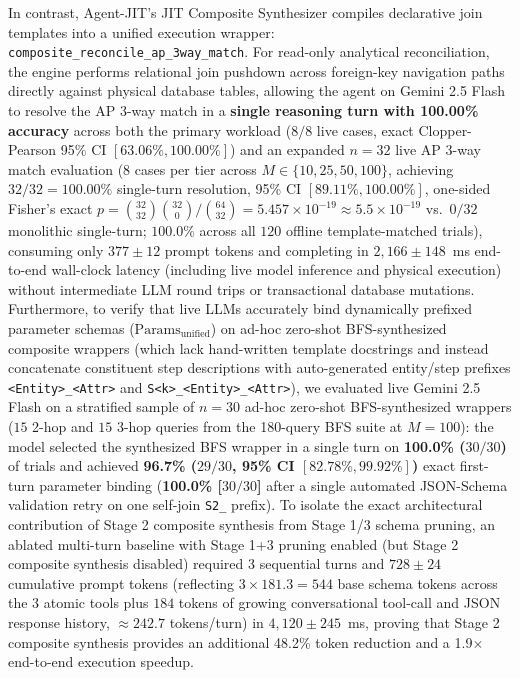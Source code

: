 \documentclass[conference,10pt]{IEEEtran}
\begin{document}
In contrast, Agent-JIT's JIT Composite Synthesizer compiles declarative join templates into a unified execution wrapper: \texttt{composite\_reconcile\_ap\_3way\_match}. For read-only analytical reconciliation, the engine performs relational join pushdown across foreign-key navigation paths directly against physical database tables, allowing the agent on Gemini 2.5 Flash to resolve the AP 3-way match in a \textbf{single reasoning turn with 100.00\% accuracy} across both the primary workload ($8/8$ live cases, exact Clopper-Pearson 95\% CI $[63.06\%, 100.00\%]$) and an expanded $n = 32$ live AP 3-way match evaluation ($8$ cases per tier across $M \in \{10, 25, 50, 100\}$, achieving $32/32 = 100.00\%$ single-turn resolution, 95\% CI $[89.11\%, 100.00\%]$, one-sided Fisher's exact $p = \binom{32}{32}\binom{32}{0}/\binom{64}{32} = 5.457 \times 10^{-19} \approx 5.5 \times 10^{-19}$ vs.\ $0/32$ monolithic single-turn; $100.0\%$ across all $120$ offline template-matched trials), consuming only $377 \pm 12$ prompt tokens and completing in $2{,}166 \pm 148$~ms end-to-end wall-clock latency (including live model inference and physical execution) without intermediate LLM round trips or transactional database mutations. Furthermore, to verify that live LLMs accurately bind dynamically prefixed parameter schemas ($\text{Params}_{\text{unified}}$) on ad-hoc zero-shot BFS-synthesized composite wrappers (which lack hand-written template docstrings and instead concatenate constituent step descriptions with auto-generated entity/step prefixes \texttt{<Entity>\_<Attr>} and \texttt{S<k>\_<Entity>\_<Attr>}), we evaluated live Gemini 2.5 Flash on a stratified sample of $n = 30$ ad-hoc zero-shot BFS-synthesized wrappers ($15$ 2-hop and $15$ 3-hop queries from the 180-query BFS suite at $M = 100$): the model selected the synthesized BFS wrapper in a single turn on \textbf{100.0\% ($30/30$)} of trials and achieved \textbf{96.7\% ($29/30$, 95\% CI $[82.78\%, 99.92\%]$)} exact first-turn parameter binding (\textbf{100.0\% [$30/30$]} after a single automated JSON-Schema validation retry on one self-join \texttt{S2\_} prefix). To isolate the exact architectural contribution of Stage 2 composite synthesis from Stage 1/3 schema pruning, an ablated multi-turn baseline with Stage 1+3 pruning enabled (but Stage 2 composite synthesis disabled) required 3 sequential turns and $728 \pm 24$ cumulative prompt tokens (reflecting $3 \times 181.3 = 544$ base schema tokens across the 3 atomic tools plus $184$ tokens of growing conversational tool-call and JSON response history, $\approx 242.7$ tokens/turn) in $4{,}120 \pm 245$~ms, proving that Stage 2 composite synthesis provides an additional 48.2\% token reduction and a 1.9$\times$ end-to-end execution speedup.
\end{document}

